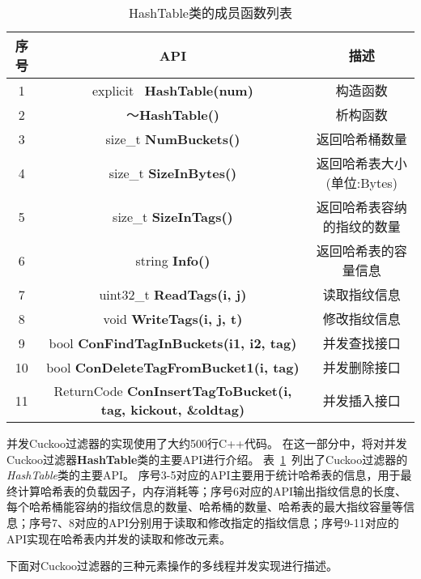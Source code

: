 \begin{table}[htbp]
  \caption{HashTable类的成员函数列表}
\label{tab:cbf_API}
\footnotesize
\centering
\begin{tabular}{ccc}
\toprule
序号&API &   描述  \\
\midrule
1	&	explicit ~\textbf{HashTable(num)}									 	&  	构造函数\\
2	&	 ～\textbf{HashTable()}  									& 	析构函数\\
3	&	size\_t  \textbf{NumBuckets()} 									&  	返回哈希桶数量\\
4	&	size\_t  \textbf{SizeInBytes() }									&  	返回哈希表大小(单位:Bytes)\\
5	&	size\_t  \textbf{SizeInTags()} 									&  	返回哈希表容纳的指纹的数量\\
6	&	string   \textbf{Info()} 											&  	返回哈希表的容量信息\\
7	&	uint32\_t  \textbf{ReadTags(i, j)}										&  	读取指纹信息\\
8	&	void  \textbf{WriteTags(i, j, t)} 										&  	修改指纹信息\\
9	&	bool  \textbf{ ConFindTagInBuckets(i1, i2, tag) }			& 	并发查找接口\\
10	&	bool  \textbf{ ConDeleteTagFromBucket1(i, tag)	}			& 	并发删除接口\\
11	&	ReturnCode  \textbf{ ConInsertTagToBucket(i, tag, kickout, \&oldtag) }	& 并发插入接口\\
\bottomrule
\end{tabular}
\end{table}

并发Cuckoo过滤器的实现使用了大约500行C++代码。
在这一部分中，将对并发Cuckoo过滤器\textbf{HashTable}类的主要API进行介绍。
表~\ref{tab:cbf_API}~列出了Cuckoo过滤器的\textit{HashTable}类的主要API。
序号3-5对应的API主要用于统计哈希表的信息，用于最终计算哈希表的负载因子，内存消耗等；序号6对应的API输出指纹信息的长度、每个哈希桶能容纳的指纹信息的数量、哈希桶的数量、哈希表的最大指纹容量等信息；序号7、8对应的API分别用于读取和修改指定的指纹信息；序号9-11对应的API实现在哈希表内并发的读取和修改元素。

下面对Cuckoo过滤器的三种元素操作的多线程并发实现进行描述。

